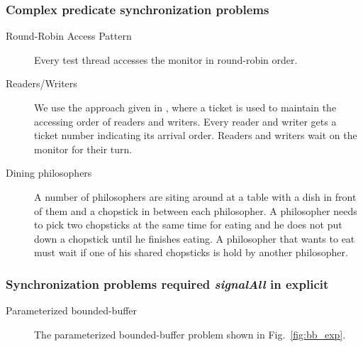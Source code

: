 \documentclass{sigplanconf}
\begin{document}
\subsubsection{Complex predicate synchronization problems}
\begin{description}
    \item[Round-Robin Access Pattern] Every test thread accesses the
        monitor in round-robin order. 
    \item[Readers/Writers  \cite{chp71}] 
    We use the approach given in \cite{bh05}, where a ticket is used
        to maintain the accessing order of readers and writers. Every reader
        and writer gets a ticket number indicating its arrival order. Readers
        and writers wait on the monitor for their turn. 
    \item [Dining philosophers \cite{dijk71}] A number of philosophers are 
        siting around at a table with a dish in front of them and a chopstick 
        in between each philosopher. A philosopher needs to pick two chopsticks at the
        same time for eating and he does not put down a chopstick until he finishes 
        eating. A philosopher that wants to eat must wait if one of his shared 
        chopsticks is hold by another philosopher.
\end{description}
\subsubsection{Synchronization problems required {\em signalAll} in explicit }
\begin{description}
    \item[Parameterized bounded-buffer   \cite{dijk65, dijk71}] The 
        parameterized bounded-buffer problem shown in Fig.~\ref{fig:bb_exp}. 
\end{description}
\end{document}
